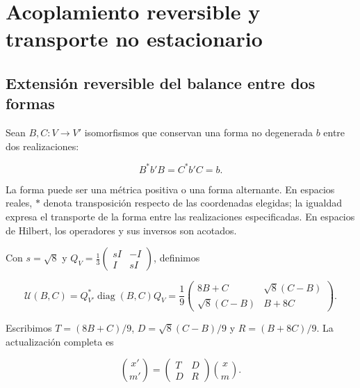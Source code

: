 \chapter{Acoplamiento reversible y transporte no estacionario}
\label{x_reciprocidad:nuclear:10}
\section{Extensión reversible del balance entre dos formas}

Sean \(B,C:V\to V'\) isomorfismos que conservan una forma no degenerada \(b\) entre dos realizaciones:



\[
B^*b'B=C^*b'C=b.
\]



La forma puede ser una métrica positiva o una forma alternante. En espacios reales, \(*\) denota transposición respecto de las coordenadas elegidas; la igualdad expresa el transporte de la forma entre las realizaciones especificadas. En espacios de Hilbert, los operadores y sus inversos son acotados.

Con \(s=\sqrt8\) y \(Q_V=\frac13\left(\begin{smallmatrix}sI&-I\\I&sI\end{smallmatrix}\right)\), definimos



\begin{equation}
\boxed{
\mathcal U(B,C)=Q_{V'}^*\operatorname{diag}(B,C)Q_V
=\frac19\begin{pmatrix}8B+C&\sqrt8(C-B)\\\sqrt8(C-B)&B+8C\end{pmatrix}.}
\label{x_reciprocidad:nuc10:eq:1}
\end{equation}



Escribimos \(T=(8B+C)/9\), \(D=\sqrt8(C-B)/9\) y \(R=(B+8C)/9\). La actualización completa es



\begin{equation}
\binom{x'}{m'}=\begin{pmatrix}T&D\\D&R\end{pmatrix}\binom{x}{m}.
\label{x_reciprocidad:nuc10:eq:2}
\end{equation}



